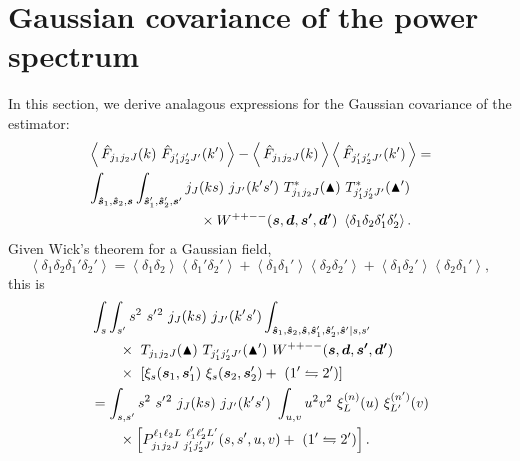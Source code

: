 \documentclass[useAMS,usenatbib]{mn2e}
\newcommand{\avg}[1]{\ensuremath{\left\langle \,#1\, \right\rangle}}
\begin{document}

\section{Gaussian covariance of the power spectrum} In this section, we derive analagous expressions for the Gaussian covariance of the estimator:
\begin{align}
&\avg{\hat{F}_{j_1 j_2 J}(k) \ \hat{F}_{j_1' j_2' J'}(k')} - \avg{\hat{F}_{j_1 j_2 J}(k)} \avg{\hat{F}_{j_1' j_2' J'}(k')}  = \notag \\
&
\int_{\boldsymbol{\hat s}_1, \boldsymbol{\hat s}_2, \boldsymbol{s}}
\int_{\boldsymbol{\hat s}_1', \boldsymbol{\hat s}_2', \boldsymbol{s}'}
j_J(ks) \ j_{J'}(k' s') \ T^{*}_{j_1 j_2 J}(\blacktriangle) \ T^{*}_{j_1' j_2' J'}(\blacktriangle') \notag \\
& \qquad \qquad \qquad \qquad \times 
W^{++--}(\boldsymbol{s}, \boldsymbol{d}, \boldsymbol{s'}, \boldsymbol{d'})
\ \left \langle \delta_1 \delta_2 \delta_{1}' \delta_{2}' \right \rangle.
\end{align}
Given Wick's theorem for a Gaussian field, 
\begin{equation}
\left \langle \delta_1 \delta_2 \delta_{1}' \delta_{2}' \right \rangle = 
\left \langle \delta_1 \delta_{2} \right \rangle
\left \langle \delta_1' \delta_{2}' \right \rangle
+
\left \langle \delta_1 \delta_{1}' \right \rangle
\left \langle \delta_2 \delta_{2}' \right \rangle + \left \langle \delta_1 \delta_{2}' \right \rangle
\left \langle \delta_2 \delta_{1}' \right \rangle,
\end{equation}
this is
\begin{align}
& \int_s \int_{s'} s^2 \ s'{}^2 \ j_J(ks) \ j_{J'}(k' s') 
\int_{\boldsymbol{\hat s}_1, \boldsymbol{\hat s}_2, \boldsymbol{\hat s}, \boldsymbol{\hat s}_1', \boldsymbol{\hat s}_2', \boldsymbol{\hat s}' | s, s'}
\notag \\
& \qquad \times \ T_{j_1 j_2 J}(\blacktriangle) \ T_{j_1' j_2' J'}(\blacktriangle') \ W^{++--}(\boldsymbol{s}, \boldsymbol{d}, \boldsymbol{s'}, \boldsymbol{d'})
\ \notag \\
& \qquad \times \ \left [ \xi_s(\boldsymbol {s}_1, \boldsymbol {s}_1') \ \xi_s(\boldsymbol {s}_2, \boldsymbol {s}_2') + \ (1' \leftrightharpoons 2') \right ] 
 \notag \\
&= \int_{s, s'}
s^2 \ s'{}^2 \ j_J(ks) \ j_{J'}(k' s') \ \int_{u, v} u^2 v^2 \ \xi^{(n)}_L(u) \ \xi^{(n')}_{L'}(v) \notag \\ 
& \qquad \times \left [  P_{j_1 j_2 J \  j_1' j_2' J'}^{\ell_1 \ell_2 L \ \ell_1' \ell_2' L'}(s, s', u, v) + \ (1' \leftrightharpoons 2') \right ].
\end{align}
\end{document}
